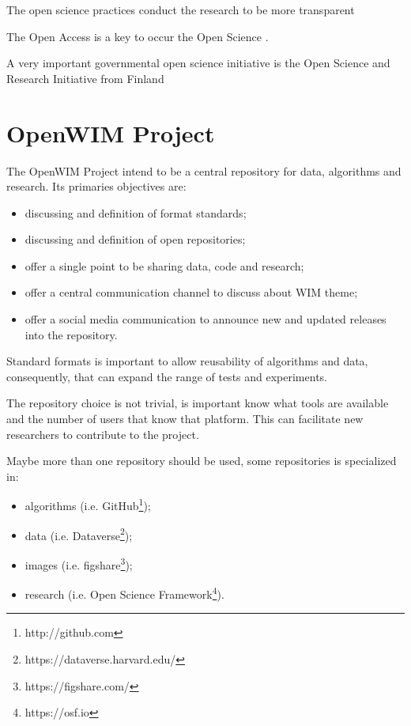 \documentclass[a4paper]{article}
\begin{document}
{The open science practices conduct the research to be more transparent \cite{dorch2015open}

The Open Access is a key to occur the Open Science \cite{margoni2016open}.

A very important governmental open science initiative is the Open Science and Research Initiative from Finland \cite{olsbo2015roadmap}

\section{OpenWIM Project}\label{open-wim}

The OpenWIM Project intend to be a central repository for data, algorithms and research. Its primaries objectives are:

\begin{itemize}
\item discussing and definition of format standards;
\item discussing and definition of open repositories;
\item offer a single point to be sharing data, code and research;
\item offer a central communication channel to discuss about WIM theme;
\item offer a social media communication to announce new and updated releases into the repository.
\end{itemize}

Standard formats is important to allow reusability of algorithms and data, consequently, that can expand the range of tests and experiments.

The repository choice is not trivial, is important know what tools are available and the number of users that know that platform. This can facilitate new researchers to contribute to the project.

Maybe more than one repository should be used, some repositories is specialized in:

\begin{itemize}
\item algorithms (i.e. GitHub\footnote{http://github.com});
\item data (i.e. Dataverse\footnote{https://dataverse.harvard.edu/});
\item images (i.e. figshare\footnote{https://figshare.com/});
\item research (i.e. Open Science Framework\footnote{https://osf.io}).
\end{itemize}

}
\end{document}
